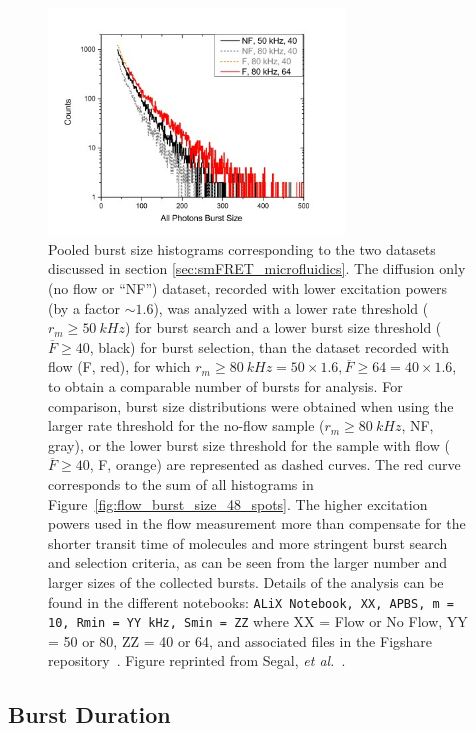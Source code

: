 \begin{figure}
\centering\includegraphics[width=0.7\textwidth]{chapters/figures/pooled_burst_size_distributions.jpg}
\caption{\label{fig:pooled_burst_size_distributions}
Pooled burst size histograms corresponding to the two datasets discussed in section \ref{sec:smFRET_microfluidics}. 
The diffusion only (no flow or \enquote{NF}) dataset, recorded with lower excitation powers (by a factor $\sim1.6$), was analyzed with a lower rate threshold ($r_m \geq 50~kHz$) for burst search and a lower burst size threshold ($\overline{F} \geq 40$, black)
for burst selection, than the dataset recorded with flow (F, red), for which $r_m \geq 80~kHz = 50 \times 1.6, \overline{F} \geq 64 = 40 \times 1.6$, to obtain a comparable number of bursts for analysis.
For comparison, burst size distributions were obtained when using the larger rate threshold for the no-flow sample ($r_m \geq 80~kHz$,  NF, gray), or the lower burst size threshold for the sample with flow ($\overline{F} \geq 40$, F, orange) are represented as dashed curves. The red curve corresponds to the sum of all histograms in
Figure~\ref{fig:flow_burst_size_48_spots}.
The higher excitation powers used in the flow measurement more than compensate for the shorter transit time of molecules and more stringent burst search and selection criteria, as can be seen from the larger number and larger sizes of the collected bursts.
Details of the analysis can be found in the different notebooks: \texttt{ALiX Notebook, XX, \ac{APBS}, m = 10, Rmin = YY kHz, Smin = ZZ} where XX = Flow or No Flow, YY = 50 or 80, ZZ = 40 or 64, and associated files in the Figshare repository~\cite{figshare_repo_2019}. 
Figure reprinted from Segal, \textit{et al.}~\cite{segal_methods_2019}.
}
\end{figure}

\subsection{Burst Duration}
\label{sec:burst_duration_apdx}

